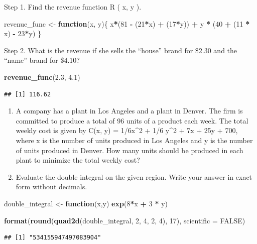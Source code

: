 \documentclass[
]{article}
\newenvironment{Shaded}{\begin{snugshade}}{\end{snugshade}}
\newcommand{\ControlFlowTok}[1]{\textcolor[rgb]{0.13,0.29,0.53}{\textbf{#1}}}
\newcommand{\DataTypeTok}[1]{\textcolor[rgb]{0.13,0.29,0.53}{#1}}
\newcommand{\DecValTok}[1]{\textcolor[rgb]{0.00,0.00,0.81}{#1}}
\newcommand{\FloatTok}[1]{\textcolor[rgb]{0.00,0.00,0.81}{#1}}
\newcommand{\KeywordTok}[1]{\textcolor[rgb]{0.13,0.29,0.53}{\textbf{#1}}}
\newcommand{\NormalTok}[1]{#1}
\newcommand{\OperatorTok}[1]{\textcolor[rgb]{0.81,0.36,0.00}{\textbf{#1}}}
\newcommand{\OtherTok}[1]{\textcolor[rgb]{0.56,0.35,0.01}{#1}}
\newcommand{\StringTok}[1]{\textcolor[rgb]{0.31,0.60,0.02}{#1}}
\begin{document}
Step 1. Find the revenue function R ( x, y ).

\begin{Shaded}
\begin{Highlighting}[]
\NormalTok{revenue_func <-}\StringTok{ }\ControlFlowTok{function}\NormalTok{(x, y)\{}
\NormalTok{  x}\OperatorTok{*}\NormalTok{(}\DecValTok{81} \OperatorTok{-}\StringTok{ }\NormalTok{(}\DecValTok{21}\OperatorTok{*}\NormalTok{x) }\OperatorTok{+}\StringTok{ }\NormalTok{(}\DecValTok{17}\OperatorTok{*}\NormalTok{y)) }\OperatorTok{+}\StringTok{ }\NormalTok{y }\OperatorTok{*}\StringTok{ }\NormalTok{(}\DecValTok{40} \OperatorTok{+}\StringTok{ }\NormalTok{(}\DecValTok{11} \OperatorTok{*}\StringTok{ }\NormalTok{x) }\OperatorTok{-}\StringTok{ }\DecValTok{23}\OperatorTok{*}\NormalTok{y)}
\NormalTok{\}}
\end{Highlighting}
\end{Shaded}

Step 2. What is the revenue if she sells the ``house'' brand for \$2.30
and the ``name'' brand for \$4.10?

\begin{Shaded}
\begin{Highlighting}[]
\KeywordTok{revenue_func}\NormalTok{(}\FloatTok{2.3}\NormalTok{, }\FloatTok{4.1}\NormalTok{)}
\end{Highlighting}
\end{Shaded}

\begin{verbatim}
## [1] 116.62
\end{verbatim}

\begin{enumerate}
\def\labelenumi{\arabic{enumi}.}
\setcounter{enumi}{3}
\item
  A company has a plant in Los Angeles and a plant in Denver. The firm
  is committed to produce a total of 96 units of a product each week.
  The total weekly cost is given by C(x, y) = 1/6x\^{}2 + 1/6 y\^{}2 +
  7x + 25y + 700, where x is the number of units produced in Los Angeles
  and y is the number of units produced in Denver. How many units should
  be produced in each plant to minimize the total weekly cost?
\item
  Evaluate the double integral on the given region. Write your answer in
  exact form without decimals.
\end{enumerate}

\begin{Shaded}
\begin{Highlighting}[]
\NormalTok{double_integral <-}\StringTok{ }\ControlFlowTok{function}\NormalTok{(x,y) }\KeywordTok{exp}\NormalTok{(}\DecValTok{8}\OperatorTok{*}\NormalTok{x }\OperatorTok{+}\StringTok{ }\DecValTok{3} \OperatorTok{*}\StringTok{ }\NormalTok{y)}

\KeywordTok{format}\NormalTok{(}\KeywordTok{round}\NormalTok{(}\KeywordTok{quad2d}\NormalTok{(double_integral, }\DecValTok{2}\NormalTok{, }\DecValTok{4}\NormalTok{, }\DecValTok{2}\NormalTok{, }\DecValTok{4}\NormalTok{), }\DecValTok{17}\NormalTok{), }\DataTypeTok{scientific =}  \OtherTok{FALSE}\NormalTok{)}
\end{Highlighting}
\end{Shaded}

\begin{verbatim}
## [1] "534155947497083904"
\end{verbatim}
\end{document}

